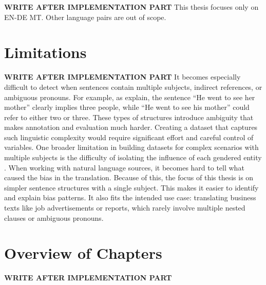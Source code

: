 \textbf{WRITE AFTER IMPLEMENTATION PART}
This thesis focuses only on EN-DE MT. Other language pairs are out of scope.

\section{Limitations}
\textbf{WRITE AFTER IMPLEMENTATION PART}
It becomes especially difficult to detect when sentences contain multiple subjects, indirect references, or ambiguous pronouns. For example, as \textcite{barclayInvestigatingMarkersDrivers2024a} explain, the sentence “He went to see her mother” clearly implies three people, while “He went to see his mother” could refer to either two or three. These types of structures introduce ambiguity that makes annotation and evaluation much harder. Creating a dataset that captures such linguistic complexity would require significant effort and careful control of variables. One broader limitation in building datasets for complex scenarios with multiple subjects is the difficulty of isolating the influence of each gendered entity \parencite{lardelliBuildingBridgesDataset2024}. When working with natural language sources, it becomes hard to tell what caused the bias in the translation. Because of this, the focus of this thesis is on simpler sentence structures with a single subject. This makes it easier to identify and explain bias patterns. It also fits the intended use case: translating business texts like job advertisements or reports, which rarely involve multiple nested clauses or ambiguous pronouns.
 

\section{Overview of Chapters}
\textbf{WRITE AFTER IMPLEMENTATION PART}
